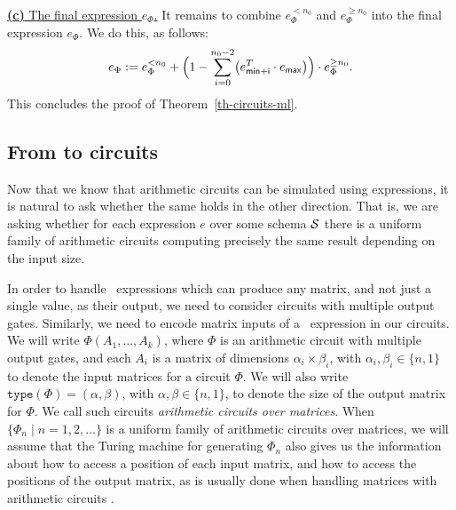 \medskip
\noindent
\underline{\textbf{(c)} The final expression $e_\Phi$.}
It remains to combine $e_\Phi^{< n_0}$ and $e_{\Phi}^{\geq n_0}$ into the final expression
$e_\Phi$. We do this, as follows:
$$
e_\Phi:=e_\Phi^{< n_0} + \Bigl(1 - \sum_{i=0}^{n_0-2} \bigl(e_{\mathsf{min}+\mathsf{i}}^T\cdot e_{\mathsf{max}}\bigr)\Bigr)\cdot e_{\Phi}^{\geq n_0}.
$$
This concludes the proof of Theorem~\ref{th-circuits-ml}.



\subsection{From \langfor to circuits}\label{subsec:formatlangtoac}

Now that we know that arithmetic circuits can be simulated using \langfor expressions, it is natural to ask whether the same holds in the other direction. That is, we are asking whether for each \langfor expression $e$ over some schema $\mathcal{S}$ there is a uniform family of arithmetic circuits computing precisely the same result depending on the input size. 

In order to handle  \langfor\ expressions which can produce any matrix, and not just a single value, as their output, we need to consider circuits with multiple output gates. Similarly, we need to encode matrix inputs of a \langfor\ expression in our circuits. We will write $\Phi(A_1,\ldots ,A_k)$, where $\Phi$ is an arithmetic circuit with multiple output gates, and each $A_i$ is a matrix of dimensions $\alpha_i\times \beta_i$, with $\alpha_i,\beta_i \in \{n,1\}$ to denote the input matrices for a circuit $\Phi$. We will also write $\texttt{type}(\Phi)=(\alpha,\beta)$, with $\alpha,\beta\in \{n,1\}$, to denote the size of the output matrix for $\Phi$. We call such circuits \textit{arithmetic circuits over matrices}. When $\{\Phi_n\mid n=1,2,\ldots\}$ is a uniform family of arithmetic circuits over matrices, we will assume that the Turing machine for generating $\Phi_n$ also gives us the information about how to access a position of each input matrix, and how to access the positions of the output matrix, as is usually done when handling matrices with arithmetic circuits \cite{Raz02}. 

